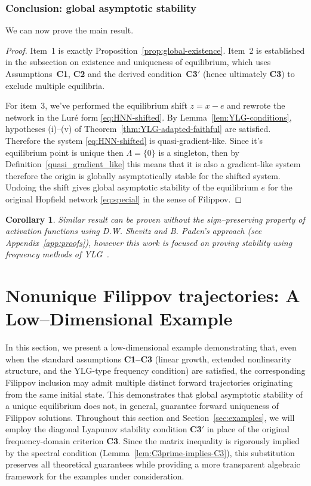 \documentclass[journal]{IEEEtran}
\theoremstyle{myplain}
\newtheorem{corollary}{Corollary}
\begin{document}
\subsubsection*{Conclusion: global asymptotic stability}

We can now prove the main result.

\begin{proof}
Item~1 is exactly Proposition~\ref{prop:global-existence}.  Item~2 is
established in the subsection on existence and uniqueness of
equilibrium, which uses Assumptions~\textbf{C1}, \textbf{C2} and the
derived condition~\textbf{C3$'$} (hence ultimately \textbf{C3}) to
exclude multiple equilibria.

For item~3, we've performed the equilibrium shift $z=x-e$ and rewrote the
network in the Lur\'e form \eqref{eq:HNN-shifted}.  By
Lemma~\ref{lem:YLG-conditions}, hypotheses (i)–(v) of
Theorem~\ref{thm:YLG-adapted-faithful} are satisfied.  Therefore the system \eqref{eq:HNN-shifted} is  quasi-gradient-like.  Since it's equilibrium point is unique then $\Lambda=\{0\}$ is a singleton, then by Definition~\ref{quasi_gradient_like} 
this means that it is also a gradient-like system therefore the origin is globally asymptotically stable for the
shifted system.  Undoing the shift gives global asymptotic
stability of the equilibrium $e$ for the original Hopfield network
\eqref{eq:special} in the sense of Filippov.
\end{proof}

\begin{corollary}
  Similar result can be proven without the sign–preserving property of activation functions using D.W. Shevitz and B. Paden’s approach (see Appendix~\ref{app:proofs}), however this work is focused on proving stability using frequency methods of YLG~\cite{YLG}.
\end{corollary}

\section{Nonunique Filippov trajectories:
A Low–Dimensional Example}\label{sec:nonunique}

In this section, we present a low-dimensional example demonstrating that, even when the standard assumptions \textbf{C1--C3} (linear growth, extended nonlinearity structure, and the YLG-type frequency condition) are satisfied, the corresponding Filippov inclusion may admit multiple distinct forward trajectories originating from the same initial state. This demonstrates that global asymptotic stability of a unique equilibrium does not, in general, guarantee forward uniqueness of Filippov solutions. Throughout this section and Section~\ref{sec:examples}, we will employ the diagonal Lyapunov stability condition \textbf{C3$'$} in place of the original frequency-domain criterion \textbf{C3}. Since the matrix inequality is rigorously implied by the spectral condition (Lemma~\ref{lem:C3prime-implies-C3}), this substitution preserves all theoretical guarantees while providing a more transparent algebraic framework for the examples under consideration.
\end{document}
